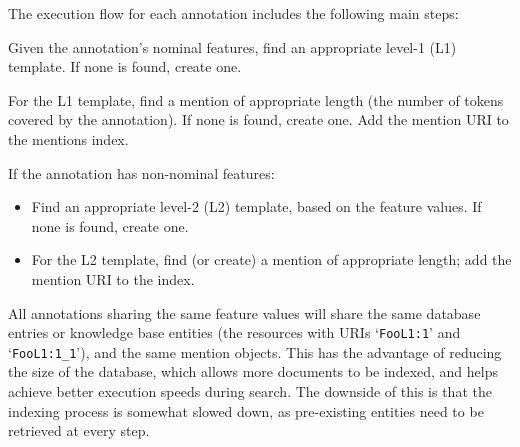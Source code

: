 The execution flow for each annotation includes the following main steps:
\bit
  \item Given the annotation's nominal features, find an appropriate level-1
  (L1) template. If none is found, create one.
  \item For the L1 template, find a mention of appropriate length (the number
  of tokens covered by the annotation). If none is found, create one. Add the
  mention URI to the mentions index.
  \item If the annotation has non-nominal features:
  \begin{itemize}
    \item Find an appropriate level-2 (L2) template, based on the feature
    values. If none is found, create one.
    \item For the L2 template, find (or create) a mention of appropriate length;
    add the mention URI to the index.
  \end{itemize}  
\eit

All annotations sharing the same feature values will share the same database
entries or knowledge base entities (the resources with URIs `\verb!FooL1:1!'
and `\verb!FooL1:1_1!'), and the same mention objects. This has the
advantage of reducing the size of the database, which allows more
documents to be indexed, and helps achieve better execution speeds during
search. The downside of this is that the indexing process is somewhat slowed
down, as pre-existing entities need to be retrieved at every step.
